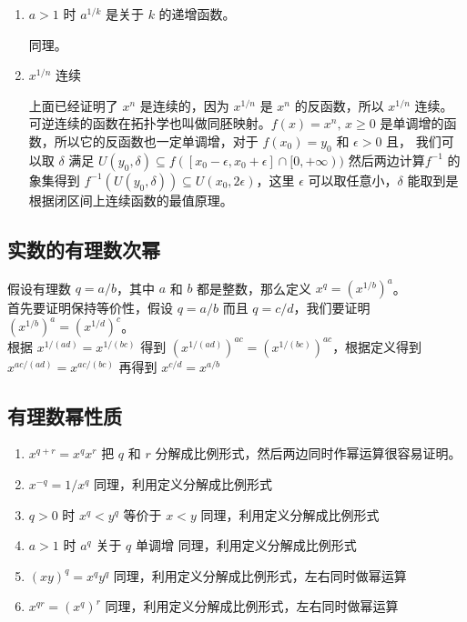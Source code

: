 \begin{enumerate}
    \item $a > 1$ 时 $a^{1/k}$ 是关于 $k$ 的递增函数。

    同理。

    \item $x ^{1/n}$ 连续

上面已经证明了 $ x^n$ 是连续的，因为 $ x ^{1/n}$ 是 $x^n$ 的反函数，所以 $x^{1/n}$ 连续。
可逆连续的函数在拓扑学也叫做同胚映射。$f(x) = x^{n},\, x \ge 0$ 是单调增的函数，所以它的反函数也一定单调增，对于 $f(x_0) = y_0$ 和 $\epsilon > 0$ 且， 我们可以取 $\delta$ 满足 $U(y_0, \delta) \subseteq f([x_0 - \epsilon, x_0 + \epsilon] \cap [0, +\infty))$
然后两边计算$f^{-1}$ 的象集得到 $f^{-1}(U(y_0, \delta)) \subseteq U(x_0, 2\epsilon)$，这里 $\epsilon$ 可以取任意小，$\delta$ 能取到是根据闭区间上连续函数的最值原理。
\end{enumerate}



\subsection{实数的有理数次幂}

假设有理数 $q = a/b $，其中 $a$ 和 $b$ 都是整数，那么定义 $x^q = (x^{1/b})^a $。 \\

首先要证明保持等价性，假设 $q = a/b$ 而且 $q = c/d$，我们要证明 $(x^{1/b})^a = (x^{1/d})^c$。\\
根据 $x^{1/(ad)} = x^{1/(bc)}$ 得到 $(x^{1/(ad)})^{ac} = (x^{1/(bc)})^{ac}$，根据定义得到 $x ^{ac/(ad)} = x^{ac/(bc)}$
再得到 $ x^{c/d} = x^{a/b}$

\subsection{有理数幂性质}

\begin{enumerate}
    \item $x^{q+r} = x^qx^r $
    把 $q$ 和 $r$ 分解成比例形式，然后两边同时作幂运算很容易证明。

    \item $x^{-q} = 1/x^q $
    同理，利用定义分解成比例形式
    
    \item $q > 0$ 时 $x^q < y^q$ 等价于 $x < y$
    同理，利用定义分解成比例形式

    \item $a > 1$ 时 $a^q$ 关于 $q$ 单调增
    同理，利用定义分解成比例形式

    \item $(xy)^q = x^q y ^ q $
    同理，利用定义分解成比例形式，左右同时做幂运算

    \item $x^{qr} = (x^q)^r $
    同理，利用定义分解成比例形式，左右同时做幂运算
\end{enumerate}


